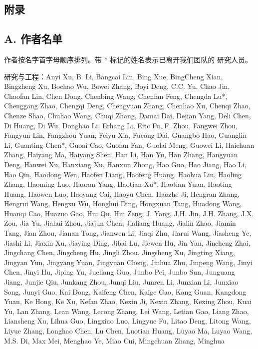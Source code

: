 \subsection{附录}\label{appendix}

\subsection{A. 作者名单}\label{a.-author-list}

作者按名字首字母顺序排列。带 * 标记的姓名表示已离开我们团队的
研究人员。

研究与工程：Anyi Xu, B. Li, Bangcai Lin, Bing Xue,
BingCheng Xian, Bingzheng Xu, Bochao Wu, Bowei Zhang, Boyi Deng, C.C.
Yu, Chao Jin, Chaofan Lin, Chen Dong, Chenbing Wang, Chenfan Feng,
Chengda Lu*, Chenggang Zhao, Chengqi Deng, Chengyuan Zhang, Chenhao Xu,
Chenqi Zhao, Chenze Shao, Chuhao Wang, Chuqi Zhang, Damai Dai, Dejian
Yang, Deli Chen, Di Huang, Di Wu, Donghao Li, Erhang Li, Eric Fu, F.
Zhou, Fangwei Zhou, Fangyun Lin, Fangzhou Yuan, Feiyu Xia, Fucong Dai,
Guangbo Hao, Guanglin Li, Guanting Chen*, Guoai Cao, Guofan Fan, Guolai
Meng, Guowei Li, Haichuan Zhang, Haiyang Ma, Haiyang Shen, Han Li, Han
Yu, Han Zhang, Hangyuan Deng, Hanwei Xu, Hanxiang Xu, Hanxun Zhong, Hao
Guo, Hao Jiang, Hao Li, Hao Qin, Haodong Wen, Haofen Liang, Haofeng
Huang, Haohua Liu, Haoling Zhang, Haoming Luo, Haoran Yang, Haotian Xu*,
Haotian Yuan, Haoting Huang, Haowen Luo, Haoyang Cai, Haoyu Chen, Haozhe
Ji, Hengran Zhang, Hengrui Wang, Hengxu Wu, Honghui Ding, Hongxuan Tang,
Huadong Wang, Huanqi Cao, Huazuo Gao, Hui Qu, Hui Zeng, J. Yang, J.H.
Jin, J.H. Zhang, J.X. Zou, Jia Yu, Jiahui Zhou, Jiajun Chen, Jialiang
Huang, Jialin Zhao, Jiamin Tang, Jian Zhou, Jianan Tong, Jianwen Li,
Jiaqi Zhu, Jiarui Wang, Jiasheng Ye, Jiashi Li, Jiaxin Xu, Jiaying Ding,
Jibai Lu, Jiewen Hu, Jin Yan, Jincheng Zhai, Jingchang Chen, Jingcheng
Hu, Jingli Zhou, Jingsheng Xu, Jingting Xiang, Jingyan Yun, Jingyang
Yuan, Jingyuan Cheng, Jinhua Zhu, Jinpeng Wang, Jinyi Chen, Jinyi Hu,
Jiping Yu, Jueliang Guo, Junbo Pei, Junbo Sun, Junguang Jiang, Junjie
Qiu, Junkang Zhou, Junqi Liu, Junren Li, Junxian Li, Junxiao Song, Junyi
Guo, Kai Dong, Kaifeng Chen, Kaige Gao, Kang Guan, Kangdong Yuan, Ke
Hong, Ke Xu, Kefan Zhao, Kexin Ji, Kexin Zhang, Kexing Zhou, Kuai Yu,
Lan Zhang, Lean Wang, Lecong Zhang, Lei Wang, Letian Gao, Liang Zhao,
Liansheng Xu, Lihua Guo, Lingxiao Luo, Lingyue Fu, Litao Deng, Litong
Wang, Liyue Zhang, Longhao Chen, Lu Chen, Luotian Huang, Luyao Ma, Luyao
Wang, M.S. Di, Max Mei, Menghao Ye, Miao Cui, Mingchuan Zhang, Minghua

